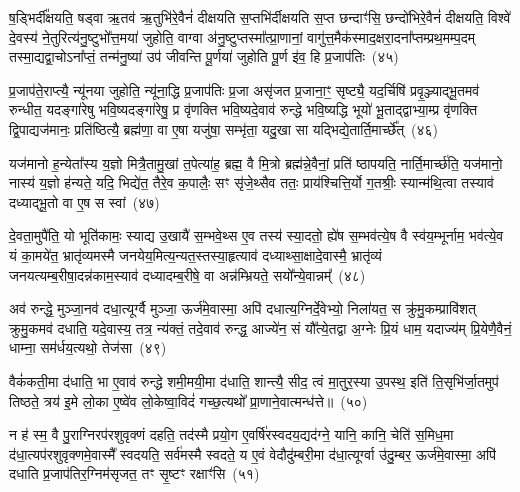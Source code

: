{\anuvakamend[{याव॑न्तो\-ऽस्य मुख॒तश्चित्य॑स्य वर्धयत्यादि॒त्यो᳚\-ऽष्टाविꣳ॑शतिश्च}]}%

ष॒ड्भिर्दी᳚क्षयति॒ षड्वा ऋ॒तव॑ ऋ॒तुभि॑रे॒वैनं॑ दीक्षयति स॒प्तभि॑र्दीक्षयति स॒प्त छन्दाꣳ॑सि॒ छन्दो॑भिरे॒वैनं॑ दीक्षयति॒ विश्वे॑ दे॒वस्य॑ ने॒तुरित्य॑नु॒ष्टुभो᳚त्त॒मया॑ जुहोति॒ वाग्वा अ॑नु॒ष्टुप्तस्मा᳚त्प्रा॒णानां॒ वागु॑त्त॒मैक॑स्माद॒क्षरा॒दना᳚प्तम्प्रथ॒मम्प॒दम् तस्मा॒द्यद्वा॒चो\-ऽना᳚प्तं॒ तन्म॑नु॒ष्या॑ उप॑ जीवन्ति पू॒र्णया॑ जुहोति पू॒र्ण इ॑व॒ हि प्र॒जाप॑तिः~(४५)

प्र॒जाप॑ते॒राप्त्यै॒ न्यू॑नया जुहोति॒ न्यू॑ना॒द्धि प्र॒जाप॑तिः प्र॒जा असृ॑जत प्र॒जाना॒ꣳ॒ सृष्ट्यै॒ यद॒र्चिषि॑ प्रवृ॒ञ्ज्याद्भू॒तमव॑ रुन्धीत॒ यदङ्गा॑रेषु भवि॒ष्यदङ्गा॑रेषु॒ प्र वृ॑णक्ति भवि॒ष्यदे॒वाव॑ रुन्द्धे भवि॒ष्यद्धि भूयो॑ भू॒ताद्द्वाभ्या॒म्प्र वृ॑णक्ति द्वि॒पाद्यज॑मानः॒ प्रति॑ष्ठित्यै॒ ब्रह्म॑णा॒ वा ए॒षा यजु॑षा॒ सम्भृ॑ता॒ यदु॒खा सा यद्भिद्ये॒तार्ति॒मार्च्छे᳚त्~(४६)

यज॑मानो ह॒न्येता᳚स्य य॒ज्ञो मित्रै॒तामु॒खां त॒पेत्या॑ह॒ ब्रह्म॒ वै मि॒त्रो ब्रह्म॑न्ने॒वैनां॒ प्रति॑ ष्ठापयति॒ नार्ति॒मार्च्छ॑ति॒ यज॑मानो॒ नास्य॑ य॒ज्ञो ह॑न्यते॒ यदि॒ भिद्ये॑त॒ तैरे॒व क॒पालैः॒ सꣳ सृ॑जे॒थ्सैव ततः॒ प्राय॑श्चित्ति॒र्यो ग॒तश्रीः॒ स्यान्म॑थि॒त्वा तस्याव॑ दध्याद्भू॒तो वा ए॒ष स स्वां~(४७)

दे॒वता॒मुपै॑ति॒ यो भूति॑कामः॒ स्याद्य उ॒खायै॑ स॒म्भवे॒थ्स ए॒व तस्य॑ स्या॒दतो॒ ह्ये॑ष स॒म्भव॑त्ये॒ष वै स्व॑य॒म्भूर्नाम॒ भव॑त्ये॒व यं का॒मये॑त॒ भ्रातृ॑व्यमस्मै जनयेय॒मित्य॒न्यत॒स्तस्या॒हृत्याव॑ दध्याथ्सा॒क्षादे॒वास्मै॒ भ्रातृ॑व्यं जनयत्यम्ब॒रीषा॒\-दन्न॑काम॒स्याव॑ दध्यादम्ब॒रीषे॒ वा अन्न॑म्भ्रियते॒ सयो᳚न्ये॒वान्नम्᳚~(४८)

अव॑ रुन्द्धे॒ मुञ्जा॒नव॑ दधा॒त्यूर्ग्वै मुञ्जा॒ ऊर्ज॑मे॒वास्मा॒ अपि॑ दधात्य॒ग्निर्दे॒वेभ्यो॒ निला॑यत॒ स क्रु॑मु॒कम्प्रावि॑शत् क्रुमु॒कमव॑ दधाति॒ यदे॒वास्य॒ तत्र॒ न्य॑क्तं॒ तदे॒वाव॑ रुन्द्ध॒ आज्ये॑न॒ सं यौ᳚त्ये॒तद्वा अ॒ग्नेः प्रि॒यं धाम॒ यदाज्य॑म् प्रि॒येणै॒वैनं॒ धाम्ना॒ सम॑र्धय॒त्यथो॒ तेज॑सा~(४९)

वैकं॑कती॒मा द॑धाति॒ भा ए॒वाव॑ रुन्द्धे शमी॒मयी॒मा द॑धाति॒ शान्त्यै॒ सीद॒ त्वं मा॒तुर॒स्या उ॒पस्थ॒ इति॑ ति॒सृभि॑र्जा॒तमुप॑ तिष्ठते॒ त्रय॑ इ॒मे लो॒का ए॒ष्वे॑व लो॒केष्वा॒विदं॑ गच्छ॒त्यथो᳚ प्रा॒णाने॒वात्मन्ध॑त्ते॥~(५०)

{}%

न ह॑ स्म॒ वै पु॒राग्निरप॑रशुवृक्णं दहति॒ तद॑स्मै प्रयो॒ग ए॒वर्\mbox{}षि॑रस्वदय॒द्यद॑ग्ने॒ यानि॒ कानि॒ चेति॑ स॒मिध॒मा द॑धा॒त्यप॑रशुवृक्णमे॒वास्मै᳚ स्वदयति॒ सर्व॑मस्मै स्वदते॒ य ए॒वं वेदौदु॑म्बरी॒मा द॑धा॒त्यूर्ग्वा उ॑दु॒म्बर॒ ऊर्ज॑मे॒वास्मा॒ अपि॑ दधाति प्र॒जाप॑तिर॒ग्निम॑सृजत॒ तꣳ सृ॒ष्टꣳ रक्षाꣳ॑सि~(५१)

